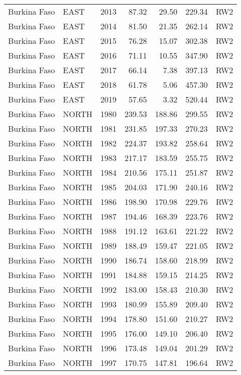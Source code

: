 \begin{longtable}{lllrrrl}
  Burkina Faso & EAST & 2013 & 87.32 & 29.50 & 229.34 & RW2 \\ 
  Burkina Faso & EAST & 2014 & 81.50 & 21.35 & 262.14 & RW2 \\ 
  Burkina Faso & EAST & 2015 & 76.28 & 15.07 & 302.38 & RW2 \\ 
  Burkina Faso & EAST & 2016 & 71.11 & 10.55 & 347.90 & RW2 \\ 
  Burkina Faso & EAST & 2017 & 66.14 & 7.38 & 397.13 & RW2 \\ 
  Burkina Faso & EAST & 2018 & 61.78 & 5.06 & 457.30 & RW2 \\ 
  Burkina Faso & EAST & 2019 & 57.65 & 3.32 & 520.44 & RW2 \\ 
  Burkina Faso & NORTH & 1980 & 239.53 & 188.86 & 299.55 & RW2 \\ 
  Burkina Faso & NORTH & 1981 & 231.85 & 197.33 & 270.23 & RW2 \\ 
  Burkina Faso & NORTH & 1982 & 224.37 & 193.82 & 258.64 & RW2 \\ 
  Burkina Faso & NORTH & 1983 & 217.17 & 183.59 & 255.75 & RW2 \\ 
  Burkina Faso & NORTH & 1984 & 210.56 & 175.11 & 251.87 & RW2 \\ 
  Burkina Faso & NORTH & 1985 & 204.03 & 171.90 & 240.16 & RW2 \\ 
  Burkina Faso & NORTH & 1986 & 198.90 & 170.98 & 229.76 & RW2 \\ 
  Burkina Faso & NORTH & 1987 & 194.46 & 168.39 & 223.76 & RW2 \\ 
  Burkina Faso & NORTH & 1988 & 191.12 & 163.61 & 221.22 & RW2 \\ 
  Burkina Faso & NORTH & 1989 & 188.49 & 159.47 & 221.05 & RW2 \\ 
  Burkina Faso & NORTH & 1990 & 186.74 & 158.60 & 218.99 & RW2 \\ 
  Burkina Faso & NORTH & 1991 & 184.88 & 159.15 & 214.25 & RW2 \\ 
  Burkina Faso & NORTH & 1992 & 183.00 & 158.43 & 210.30 & RW2 \\ 
  Burkina Faso & NORTH & 1993 & 180.99 & 155.89 & 209.40 & RW2 \\ 
  Burkina Faso & NORTH & 1994 & 178.80 & 151.60 & 210.27 & RW2 \\ 
  Burkina Faso & NORTH & 1995 & 176.00 & 149.10 & 206.40 & RW2 \\ 
  Burkina Faso & NORTH & 1996 & 173.48 & 149.04 & 201.29 & RW2 \\ 
  Burkina Faso & NORTH & 1997 & 170.75 & 147.81 & 196.64 & RW2 \\ 

\end{longtable}
